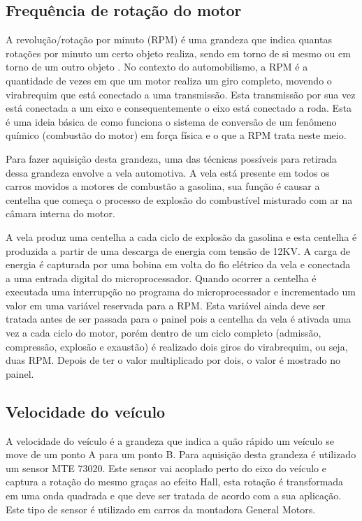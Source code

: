 \subsection{Frequência de rotação do motor}

A revolução/rotação por minuto (RPM) é uma grandeza que indica quantas rotações por minuto um certo objeto realiza, sendo em torno de si mesmo ou em torno de um outro objeto \cite{Dias2010}. No contexto do automobilismo, a RPM é a quantidade de vezes em que um motor realiza um giro completo, movendo o virabrequim que está conectado a uma transmissão. Esta transmissão por sua vez está conectada a um eixo e consequentemente o eixo está conectado a roda. Esta é uma ideia básica de como funciona o sistema de conversão de um fenômeno químico (combustão do motor) em força física e o que a RPM trata neste meio.

Para fazer aquisição desta grandeza, uma das técnicas possíveis para retirada dessa grandeza envolve a vela automotiva\cite{projetoMiniBaja2006}. A vela está presente em todos os carros movidos a motores de combustão a gasolina, sua função é causar a centelha que começa o processo de explosão do combustível misturado com ar na câmara interna do motor.       

A vela produz uma centelha a cada ciclo de explosão da gasolina e esta centelha é produzida a partir de uma descarga de energia com tensão de 12KV\cite{projetoMiniBaja2006}. A carga de energia é capturada por uma bobina em volta do fio elétrico da vela e conectada a uma entrada digital do microprocessador. Quando ocorrer a centelha é executada uma interrupção no programa do microprocessador e incrementado um valor em uma variável reservada para a RPM. Esta variável ainda deve ser tratada antes de ser passada para o painel pois a centelha da vela é ativada uma vez a cada ciclo do motor, porém dentro de um ciclo completo (admissão, compressão, explosão e exaustão) é realizado dois giros do virabrequim, ou seja, duas RPM. Depois de ter o valor multiplicado por dois, o valor é mostrado no painel. 

\subsection{Velocidade do veículo}

A velocidade do veículo é a grandeza que indica a quão rápido um veículo se move de um ponto A para um ponto B. Para aquisição desta grandeza é utilizado um sensor MTE 73020. Este sensor vai acoplado perto do eixo do veículo e captura a rotação do mesmo graças ao efeito Hall, esta rotação é transformada em uma onda quadrada \cite{MTEsensorVelocidade} e que deve ser tratada de acordo com a sua aplicação. Este tipo de sensor é utilizado em carros da montadora General Motors.  

